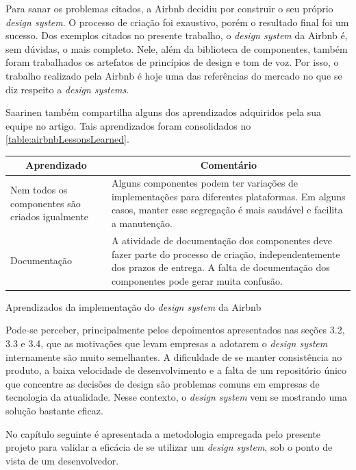 Para sanar os problemas citados, a Airbnb decidiu por construir o seu próprio \textit{design system}. O processo de criação foi exaustivo, porém o resultado final foi um sucesso. Dos exemplos citados no presente trabalho, o \textit{design system} da Airbnb é, sem dúvidas, o mais completo. Nele, além da biblioteca de componentes, também foram trabalhados os artefatos de princípios de design e tom de voz. Por isso, o trabalho realizado pela Airbnb é hoje uma das referências do mercado no que se diz respeito a \textit{design systems}.

Saarinen também compartilha alguns dos aprendizados adquiridos pela sua equipe no artigo. Tais aprendizados foram consolidados no \autoref{table:airbnbLessonsLearned}.

\begin{quadro}
\centering
\begin{tabular}{|m{4cm}|m{10cm}|} \hline
	
	\multicolumn{1}{|c|}{\bfseries Aprendizado} & \multicolumn{1}{c|}{\bfseries Comentário} \\\hline
	
	 Nem todos os componentes são criados igualmente & Alguns componentes podem ter variações de implementações para diferentes plataformas. Em alguns casos, manter esse segregação é mais saudável e facilita a manutenção. \\\hline
	 
	 Documentação & A atividade de documentação dos componentes deve fazer parte do processo de criação, independentemente dos prazos de entrega. A falta de documentação dos componentes pode gerar muita confusão. \\\hline
    
\end{tabular}
\caption{Aprendizados da implementação do \textit{design system} da Airbnb}
\label{table:airbnbLessonsLearned}
\end{quadro}

Pode-se perceber, principalmente pelos depoimentos apresentados nas seções 3.2, 3.3 e 3.4, que as motivações que levam empresas a adotarem o \textit{design system} internamente são muito semelhantes. A dificuldade de se manter consistência no produto, a baixa velocidade de desenvolvimento e a falta de um repositório único que concentre as decisões de design são problemas comuns em empresas de tecnologia da atualidade. Nesse contexto, o \textit{design system} vem se mostrando uma solução bastante eficaz.

No capítulo seguinte é apresentada a metodologia empregada pelo presente projeto para validar a eficácia de se utilizar um \textit{design system}, sob o ponto de vista de um desenvolvedor.
